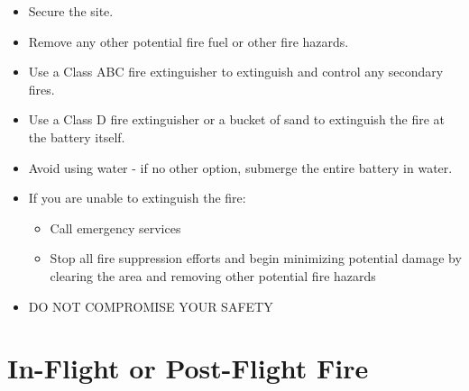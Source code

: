 \documentclass[
]{book}
\providecommand{\tightlist}{%
  \setlength{\itemsep}{0pt}\setlength{\parskip}{0pt}}
\begin{document}
\begin{itemize}
\tightlist
\item
  Secure the site.
\item
  Remove any other potential fire fuel or other fire hazards.
\item
  Use a Class ABC fire extinguisher to extinguish and control any secondary fires.
\item
  Use a Class D fire extinguisher or a bucket of sand to extinguish the fire at the battery itself.
\item
  Avoid using water - if no other option, submerge the entire battery in water.
\item
  If you are unable to extinguish the fire:

  \begin{itemize}
  \tightlist
  \item
    Call emergency services
  \item
    Stop all fire suppression efforts and begin minimizing potential damage by clearing the area and removing other potential fire hazards
  \end{itemize}
\item
  DO NOT COMPROMISE YOUR SAFETY
\end{itemize}

\hypertarget{in-flight-or-post-flight-fire}{%
\section{In-Flight or Post-Flight Fire}\label{in-flight-or-post-flight-fire}}
\end{document}

